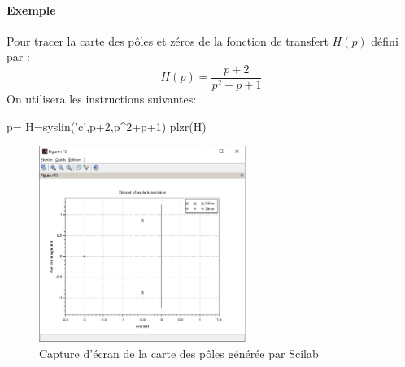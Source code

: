 \paragraph{Exemple}
Pour tracer la carte des pôles et zéros de la fonction de transfert $H(p)$ 
défini par :
\[
H(p)=\dfrac{p+2}{p^2+p+1}
\]
On utilisera les instructions suivantes:
\begin{Scilabcode}
p=%
H=syslin('c',p+2,p^2+p+1)
plzr(H)
\end{Scilabcode}
\begin{figure}[!b]
    \centering
    \includegraphics[width=0.6\textwidth]{fig/capture_SCILAB-plzr.eps}
    \caption{Capture d'écran de la carte des pôles générée par Scilab}
\end{figure}
\clearpage
